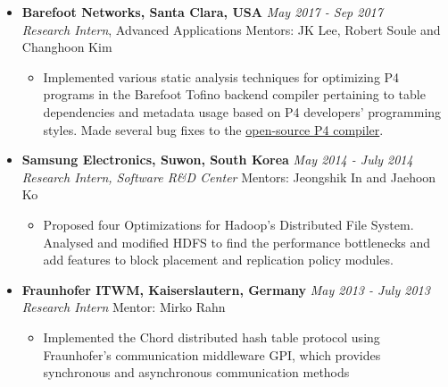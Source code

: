 \documentclass[11pt,a4paper,sans]{moderncv}        %
\begin{document}
\begin{itemize}
	\item \textbf{Barefoot Networks, Santa Clara, USA} \hfill \emph{May 2017 - Sep 2017} \\
	\emph{Research Intern}, Advanced Applications \hfill Mentors: JK Lee, Robert Soule and Changhoon Kim
	\begin{itemize}
		\item Implemented various static analysis techniques for optimizing P4 programs in the Barefoot Tofino backend compiler
		pertaining to table dependencies and metadata usage based on P4
		developers' programming styles. Made several
		bug fixes to the \href{https://github.com/p4lang/p4c}{open-source P4 compiler}.
	\end{itemize}
	\vspace*{6pt}

	\item \textbf{Samsung Electronics, Suwon, South Korea} \hfill \emph{May 2014 - July 2014} \\
	\emph{Research Intern, Software R\&D Center} \hfill Mentors: Jeongshik In and Jaehoon Ko
	\begin{itemize}
		\item Proposed four Optimizations for Hadoop's Distributed File System. Analysed and
		modified HDFS to find the performance bottlenecks and add features to
		block placement and replication policy modules.
	\end{itemize}

	\vspace*{6pt}
	\item \textbf{Fraunhofer ITWM, Kaiserslautern, Germany} \hfill \emph{May 2013 - July 2013} \\
	\emph{Research Intern} \hfill Mentor: Mirko Rahn
		\begin{itemize}
			\item Implemented the Chord distributed hash table protocol using Fraunhofer's communication middleware GPI, which provides
			synchronous and asynchronous communication methods
		\end{itemize}

\end{itemize}

\vspace*{2pt}
\end{document}
